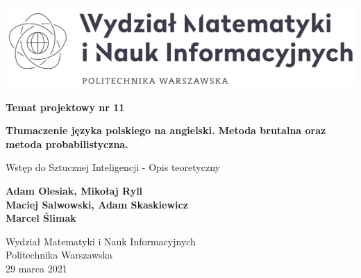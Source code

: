 \begin{titlepage}
    \begin{center}
        
        \includegraphics[width=1\textwidth]{logo_mini.png}
        
        \vspace*{1cm}
        
        \Huge
        \textbf{Temat projektowy nr 11}
        
        \vspace{0.5cm}
        
        \textbf{Tłumaczenie języka polskiego na angielski. Metoda brutalna oraz metoda probabilistyczna.}
            
        \vspace{0.5cm}
        \LARGE
        Wstęp do Sztucznej Inteligencji - Opis teoretyczny
            
        \vspace{1.5cm}
            
        \textbf{Adam Olesiak, Mikołaj Ryll\\ Maciej Salwowski, Adam Skaskiewicz\\ Marcel Ślimak } \\
        
            
        \vfill
        
        
            
        \vspace{0.8cm}
            
        \small
        Wydział Matematyki i Nauk Informacyjnych\\
        Politechnika Warszawska\\
        29 marca 2021
            
    \end{center}
\end{titlepage}